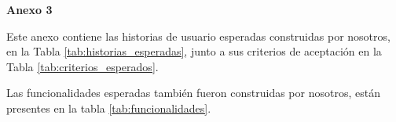 \documentclass{prgrado}
\begin{document}

\newpage
\vspace{0.75\baselineskip}
{\large\bfseries Anexo 3\par}
\vspace{0.25\baselineskip}

Este anexo contiene las historias de usuario esperadas construidas por nosotros, en la Tabla \ref{tab:historias_esperadas}, junto a sus criterios de aceptación en la Tabla \ref{tab:criterios_esperados}.

Las funcionalidades esperadas también fueron construidas por nosotros, están presentes en la tabla \ref{tab:funcionalidades}.
\end{document}
